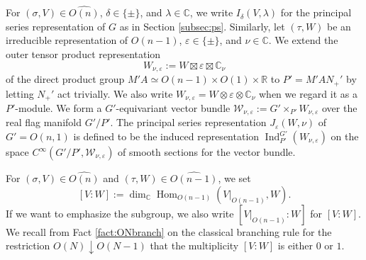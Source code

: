 For $(\sigma, V) \in \widehat {O(n)}$, 
 $\delta \in \{\pm\}$, 
 and $\lambda \in {\mathbb{C}}$, 
 we write $I_{\delta}(V, \lambda)$
 for the principal series representation
 of $G$ as in Section \ref{subsec:ps}.  
Similarly, 
 let $(\tau, W)$ be an irreducible representation of $O(n-1)$, 
 $\varepsilon \in \{\pm \}$, 
 and $\nu \in{\mathbb{C}}$.  
We extend the outer tensor product representation
\[
 W_{\nu,\varepsilon}
:=W \boxtimes {\varepsilon} \boxtimes{\mathbb{C}}_{\nu}
\]
of the direct product group $M' A \simeq O(n-1) \times O(1) \times {\mathbb{R}}
$ to $P' = M' A N_+'$
 by letting $N_+'$ act trivially.  
We also write $W_{\nu,\varepsilon}=W \otimes \varepsilon \otimes {\mathbb{C}}_{\nu}$
 when we regard it as a $P'$-module.  
We form a $G'$-equivariant vector bundle
$
  {\mathcal{W}}_{\nu,\varepsilon}
  :=
  G' \times_{P'} W_{\nu,\varepsilon}
$
 over the real flag manifold $G'/P'$.  
The principal series representation 
 $J_{\varepsilon}(W, \nu)$
 of $G'=O(n,1)$
 is defined to be the induced representation
 $\operatorname{Ind}_{P'}^{G'}(W_{\nu,\varepsilon})$
 on the space 
 $C^{\infty}(G'/P',{\mathcal{W}}_{\nu,\varepsilon})$
 of smooth sections for the vector bundle.  



For $(\sigma, V) \in \widehat {O(n)}$
 and $(\tau, W) \in \widehat {O(n-1)}$, 
 we set 
\begin{equation}
\label{eqn:multVW}
    [V:W]:= \dim_{\mathbb{C}} \operatorname{Hom}_{O(n-1)}(V|_{O(n-1)}, W).  
\end{equation}
If we want to emphasize the subgroup,
 we also write $[V|_{O(n-1)}:W]$ for $[V:W]$.  
We recall from Fact \ref{fact:ONbranch}
 on the classical branching rule for the restriction
 $O(N)\downarrow O(N-1)$
 that the multiplicity $[V:W]$ is either $0$ or $1$.  



